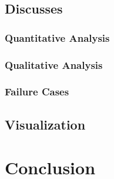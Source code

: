 \documentclass[../paper.tex]{subfiles}
\begin{document}
\subsection{Discusses}

\subsubsection{Quantitative Analysis}



\subsubsection{Qualitative Analysis}

\subsubsection{Failure Cases}

\subsection{Visualization}


\section{Conclusion}
\end{document}
